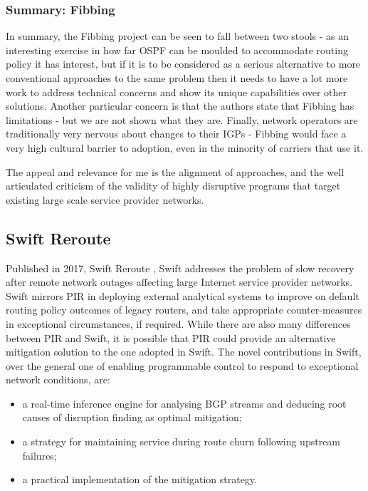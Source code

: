 \subsubsection{Summary: Fibbing}
In summary, the Fibbing project can be seen to fall between two stools - as an interesting exercise in how far OSPF can be moulded to accommodate routing policy it has interest,
but if it is to be considered as a serious alternative to more conventional approaches to the same problem then it needs to have a lot more work to address technical concerns and show its unique capabilities over other solutions.  Another particular concern is that the authors state that Fibbing has limitations - but we are not shown what they are.  Finally, network operators are traditionally very nervous about changes to their IGPs - Fibbing would face a very high cultural barrier to adoption, even in the minority of carriers that use it.


The appeal and relevance for me is the alignment of approaches, and the well articulated criticism of the validity of highly disruptive programs that target existing large scale service provider networks.

\subsection{Swift Reroute}
Published in 2017, Swift Reroute \cite{Holterbach2017}, Swift addresses the problem of slow recovery after remote network outages affecting large Internet service provider networks.
Swift mirrors PIR in deploying external analytical systems to improve on default routing policy outcomes of legacy routers, and take appropriate counter-measures in exceptional circumstances, if required.
While there are also many differences between PIR and Swift, it is possible that PIR could provide an alternative mitigation solution to the one adopted in Swift.  The novel contributions in Swift, over the general one of enabling programmable control to respond to exceptional network conditions, are:
\begin{itemize}[noitemsep,nolistsep]
	\item{a real-time inference engine for analysing BGP streams and deducing root causes of disruption finding as optimal mitigation;}
	\item {a strategy for maintaining service during route churn following upstream failures;}
	\item {a practical implementation of the mitigation strategy.}
\end{itemize}
\smallskip
